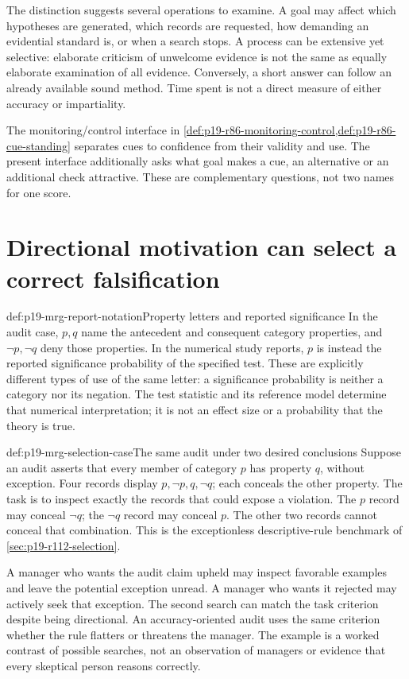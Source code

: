 The distinction suggests several operations to examine. A goal may affect
which hypotheses are generated, which records are requested, how demanding
an evidential standard is, or when a search stops. A process can be extensive
yet selective: elaborate criticism of unwelcome evidence is not the same as
equally elaborate examination of all evidence. Conversely, a short answer
can follow an already available sound method. Time spent is not a direct
measure of either accuracy or impartiality.

The monitoring/control interface in
\cref{def:p19-r86-monitoring-control,def:p19-r86-cue-standing}
separates cues to confidence from their validity and use.
The present interface additionally asks what goal makes a cue, an alternative
or an additional check attractive. These are complementary questions, not
two names for one score.

\section{Directional motivation can select a correct falsification}
\label{sec:p19-mrg-directional}

\begin{hbconvention}{def:p19-mrg-report-notation}{Property letters and reported significance}
In the audit case, \(p,q\) name the antecedent and consequent category
properties, and \(\neg p,\neg q\) deny those properties. In the numerical
study reports, \(p\) is instead the reported significance probability of
the specified test. These are explicitly different types of use of the
same letter: a significance probability is neither a category nor its
negation. The test statistic and its reference model determine that
numerical interpretation; it is not an effect size or a probability that
the theory is true.
\end{hbconvention}

\begin{hbexample}{def:p19-mrg-selection-case}{The same audit under two desired conclusions}
Suppose an audit asserts that every member of category \(p\) has property
\(q\), without exception. Four records display \(p,\neg p,q,\neg q\);
each conceals the other property. The task is to inspect exactly the records
that could expose a violation. The \(p\) record may conceal \(\neg q\);
the \(\neg q\) record may conceal \(p\). The other two records cannot
conceal that combination. This is the exceptionless descriptive-rule
benchmark of \cref{sec:p19-r112-selection}.

A manager who wants the audit claim upheld may inspect favorable examples
and leave the potential exception unread. A manager who wants it rejected
may actively seek that exception. The second search can match the task
criterion despite being directional. An accuracy-oriented audit uses the
same criterion whether the rule flatters or threatens the manager.
The example is a worked contrast of possible searches, not an observation
of managers or evidence that every skeptical person reasons correctly.
\end{hbexample}

